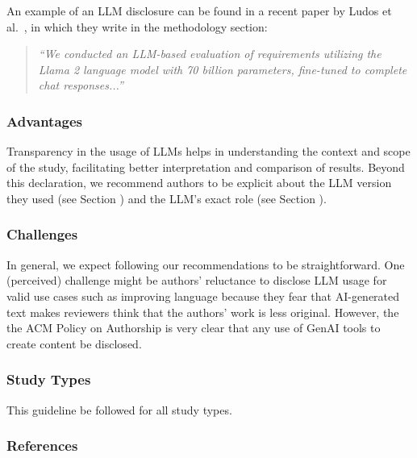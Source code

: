 An example of an LLM disclosure can be found in a recent paper by Ludos et al.~\cite{DBLP:conf/re/LubosFTGMEL24}, in which they write in the methodology section:

\begin{quote}
\it
``We conducted an LLM-based evaluation of requirements utilizing the Llama 2 language model with 70 billion parameters, fine-tuned to complete chat responses...''
\end{quote}


\subsubsection{Advantages}

Transparency in the usage of LLMs helps in understanding the context and scope of the study, facilitating better interpretation and comparison of results.
Beyond this declaration, we recommend authors to be explicit about the LLM version they used (see Section \modelversion) and the LLM's exact role (see Section \toolarchitecture).


\subsubsection{Challenges}

In general, we expect following our recommendations to be straightforward.
One (perceived) challenge might be authors' reluctance to disclose LLM usage for valid use cases such as improving language because they fear that AI-generated text makes reviewers think that the authors' work is less original.
However, the the ACM Policy on Authorship is very clear that any use of GenAI tools to create content \must be disclosed.


\subsubsection{Study Types}

This guideline \must be followed for all study types.


\subsubsection{References}





